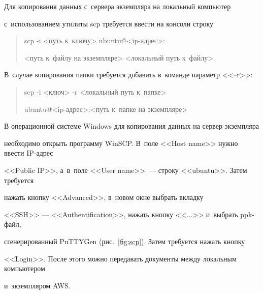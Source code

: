 Для копирования данных с~сервера экземпляра на локальный компьютер 


с~использованием утилиты scp требуется ввести на консоли строку


\begin{quote}


\tt{scp -i <путь к~ключу> ubuntu@<ip-адрес>:





<путь к~файлу на экземпляре> <локальный путь к~файлу> }


\end{quote}


В~случае копирования папки требуется добавить в~команде параметр <<--r>>:


\begin{quote}


\tt{scp -i <ключ> -r <локальный путь к~папке>





ubuntu@<ip-адрес>:<путь к~папке на экземпляре> }


\end{quote}





В операционной системе Windows для копирования данных на сервер экземпляра 


необходимо открыть программу WinSCP. В~поле <<Host name>> нужно ввести IP-адрес 


<<Public IP>>, а~в~поле <<User name>>~--- строку <<ubuntu>>. Затем требуется 


нажать кнопку <<Advanced>>, в~новом окне выбрать вкладку


<<SSH>> --- <<Authentification>>, нажать кнопку <<$\ldots$>> и~выбрать ppk-файл, 


сгенерированный PuTTYGen (рис.~\ref{fig:scp}). Затем требуется нажать кнопку 


<<Login>>. После этого можно передавать документы между локальным компьютером 


и~экземпляром AWS.











\vspace*{-12pt}





